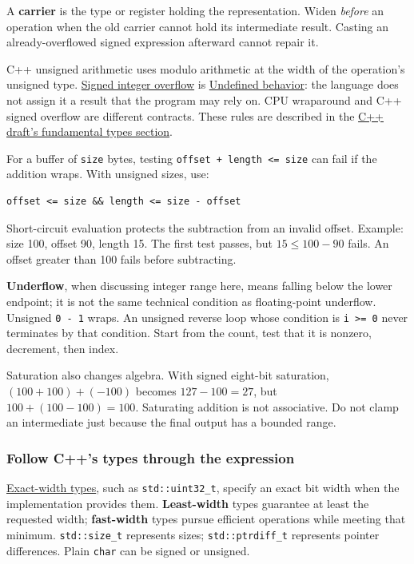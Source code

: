 A \textbf{carrier} is the type or register holding the representation. Widen \emph{before} an operation when the old carrier cannot hold its intermediate result. Casting an already-overflowed signed expression afterward cannot repair it.

C++ unsigned arithmetic uses modulo arithmetic at the width of the operation's unsigned type. \hyperref[appendix-1a599c924a4e]{Signed integer overflow} is \hyperref[appendix-f558f5b4d8f2]{Undefined behavior}: the language does not assign it a result that the program may rely on. CPU wraparound and C++ signed overflow are different contracts. These rules are described in the \href{https://eel.is/c++draft/basic.fundamental}{C++ draft's fundamental types section}.

For a buffer of \texttt{size} bytes, testing \texttt{offset\ +\ length\ \textless{}=\ size} can fail if the addition wraps. With unsigned sizes, use:

\begin{verbatim}
offset <= size && length <= size - offset
\end{verbatim}

Short-circuit evaluation protects the subtraction from an invalid offset. Example: size 100, offset 90, length 15. The first test passes, but \(15\le 100-90\) fails. An offset greater than 100 fails before subtracting.

\textbf{Underflow}, when discussing integer range here, means falling below the lower endpoint; it is not the same technical condition as floating-point underflow. Unsigned \texttt{0\ -\ 1} wraps. An unsigned reverse loop whose condition is \texttt{i\ \textgreater{}=\ 0} never terminates by that condition. Start from the count, test that it is nonzero, decrement, then index.

Saturation also changes algebra. With signed eight-bit saturation, \((100+100)+(-100)\) becomes \(127-100=27\), but \(100+(100-100)=100\). Saturating addition is not associative. Do not clamp an intermediate just because the final output has a bounded range.

\subsubsection{Follow C++'s types through the expression}\label{05-engine-i-ch001-follow-cs-types-through-the-expression}

\hyperref[appendix-cc04044b5782]{Exact-width types}, such as \texttt{std::uint32\_t}, specify an exact bit width when the implementation provides them. \textbf{Least-width} types guarantee at least the requested width; \textbf{fast-width} types pursue efficient operations while meeting that minimum. \texttt{std::size\_t} represents sizes; \texttt{std::ptrdiff\_t} represents pointer differences. Plain \texttt{char} can be signed or unsigned.

